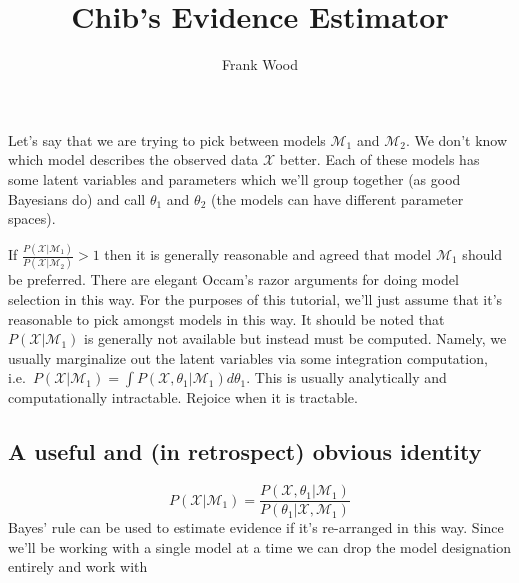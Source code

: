 \documentclass[11pt]{amsart}
\title{Chib's Evidence Estimator}
\author{Frank Wood}
\begin{document}
\maketitle

 Let's say that we are trying to pick between models $\mathcal{M}_1$ and $\mathcal{M}_2$.  We don't know which model describes the observed data $\mathcal{X}$ better.  Each of these models has some latent variables and parameters which we'll group together (as good Bayesians do) and call $\theta_1$ and $\theta_2$ (the models can have different parameter spaces).  

If $\frac{P(\mathcal{X}|\mathcal{M}_1)}{P(\mathcal{X}|\mathcal{M}_2)}>1$ then it is generally reasonable and agreed that model $\mathcal{M}_1$ should be preferred.   There are elegant Occam's razor arguments \citep{Rasmussen2001} for doing model selection in this way.  For the purposes of this tutorial, we'll just assume that it's reasonable to pick amongst models in this way.  It should be noted that $P(\mathcal{X}|\mathcal{M}_1)$ is generally not available but instead must be computed.  Namely, we usually marginalize out the latent variables via some integration computation, i.e.~$P(\mathcal{X}|\mathcal{M}_1) = \int P(\mathcal{X},\theta_1|\mathcal{M}_1) d\theta_1.$  This is usually analytically and computationally intractable.  Rejoice when it is tractable.

\subsection{A useful and (in retrospect) obvious identity}

\begin{equation}
P(\mathcal{X}|\mathcal{M}_1) = \frac{P(\mathcal{X}, \theta_1|\mathcal{M}_1)}{P(\theta_1|\mathcal{X}, \mathcal{M}_1)}
\end{equation}
%
Bayes' rule can be used to estimate evidence if it's re-arranged in this way.  Since we'll be working with a single model at a time we can drop the model designation entirely and work with
 
\end{document}
